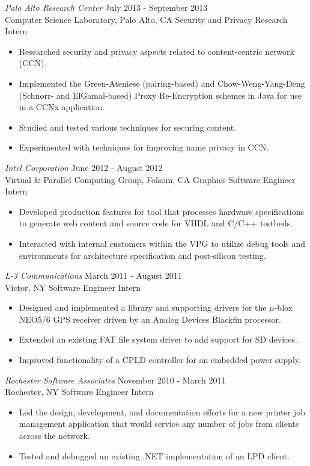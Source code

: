 \documentclass[10pt]{res} %
\begin{document}
\begin{resume}
{\sl Palo Alto Research Center} \hfill July 2013 - September 2013 \\
Computer Science Laboratory, Palo Alto, CA \hfill Security and Privacy Research Intern
\begin{itemize} \itemsep -2pt %
\item Researched security and privacy aspects related to content-centric network (CCN).
\item Implemented the Green-Ateniese (pairing-based) and Chow-Weng-Yang-Deng (Schnorr- and ElGamal-based) Proxy Re-Encryption schemes in Java for use in a CCNx application.
\item Studied and tested various techniques for securing content.
\item Experimented with techniques for improving name privacy in CCN.
\end{itemize}

{\sl Intel Corporation} \hfill June 2012 - August 2012 \\
Virtual \& Parallel Computing Group, Folsom, CA \hfill Graphics Software Engineer Intern
\begin{itemize} \itemsep -2pt %
\item Developed production features for tool that processes hardware specifications to generate web content and source code for VHDL and C/C++ testbeds.
\item Interacted with internal customers within the VPG to utilize debug tools and environments for architecture specification and post-silicon testing.
\end{itemize}

{\sl L-3 Communications} \hfill March 2011 - August 2011 \\
Victor, NY \hfill Software Engineer Intern
\begin{itemize} \itemsep -2pt %
\item Designed and implemented a library and supporting drivers for the $\mu$-blox NEO5/6 GPS receiver driven by an Analog Devices Blackfin processor.
\item Extended an existing FAT file system driver to add support for SD devices.
\item Improved functionality of a CPLD controller for an embedded power supply.
\end{itemize}

{\sl Rochester Software Associates} \hfill November 2010 - March 2011 \\
Rochester, NY \hfill Software Engineer Intern
\begin{itemize} \itemsep -2pt %
\item Led the design, development, and documentation efforts for a new printer job management application that would service any number of jobs from clients across the network.
\item Tested and debugged an existing .NET implementation of an LPD client.
\end{itemize}


\end{resume}
\end{document}
